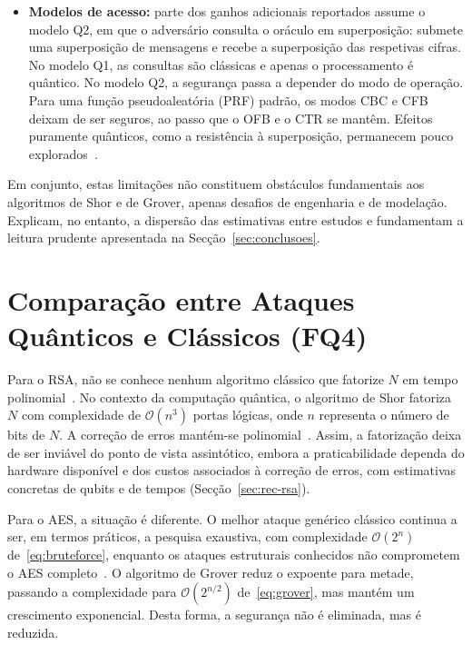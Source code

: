 \documentclass[11pt,a4paper]{article}
\begin{document}
\begin{itemize}
\item \textbf{Modelos de acesso:} parte dos ganhos adicionais reportados assume o modelo Q2, em que o adversário consulta o oráculo em superposição: submete uma superposição de mensagens e recebe a superposição das respetivas cifras. No modelo Q1, as consultas são clássicas e apenas o processamento é quântico. No modelo Q2, a segurança passa a depender do modo de operação. Para uma função pseudoaleatória (PRF) padrão, os modos CBC e CFB deixam de ser seguros, ao passo que o OFB e o CTR se mantêm. Efeitos puramente quânticos, como a resistência à superposição, permanecem pouco explorados~\cite{chethana2025}.
\end{itemize}

Em conjunto, estas limitações não constituem obstáculos fundamentais aos algoritmos de Shor e de Grover, apenas desafios de engenharia e de modelação. Explicam, no entanto, a dispersão das estimativas entre estudos e fundamentam a leitura prudente apresentada na Secção~\ref{sec:conclusoes}.

\clearpage

\section{Comparação entre Ataques Quânticos e Clássicos (FQ4)}\label{sec:comparacao}

Para o RSA, não se conhece nenhum algoritmo clássico que fatorize $N$ em tempo polinomial~\cite{zhou2025}. No contexto da computação quântica, o algoritmo de Shor fatoriza $N$ com complexidade de $\mathcal{O}(n^{3})$ portas lógicas, onde $n$ representa o número de bits de $N$. A correção de erros mantém-se polinomial~\cite{oonishi2026}. Assim, a fatorização deixa de ser inviável do ponto de vista assintótico, embora a praticabilidade dependa do hardware disponível e dos custos associados à correção de erros, com estimativas concretas de qubits e de tempos (Secção~\ref{sec:rec-rsa}).

Para o AES, a situação é diferente. O melhor ataque genérico clássico continua a ser, em termos práticos, a pesquisa exaustiva, com complexidade $\mathcal{O}(2^{n})$ de~\eqref{eq:bruteforce}, enquanto os ataques estruturais conhecidos não comprometem o AES completo~\cite{chethana2025}. O algoritmo de Grover reduz o expoente para metade, passando a complexidade para $\mathcal{O}(2^{n/2})$ de~\eqref{eq:grover}, mas mantém um crescimento exponencial. Desta forma, a segurança não é eliminada, mas é reduzida.
\end{document}
